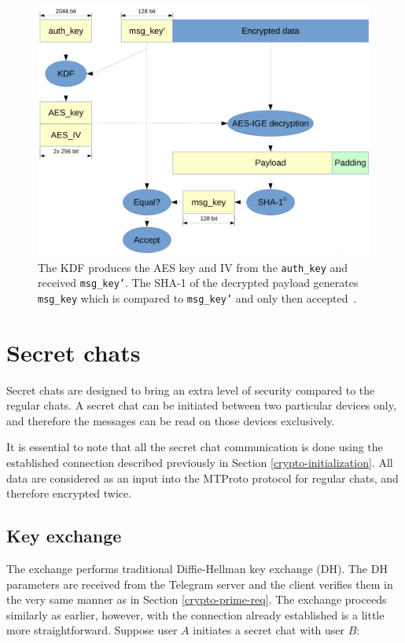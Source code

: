 \documentclass[thesis=M,english]{FITthesis}[2012/10/20]
\begin{document}
\begin{figure}[htb]
	\centering
	\includegraphics[width=1\textwidth]{mtproto-decflow.pdf}
	\caption[MTProto decryption flow]{The KDF produces the AES key and IV from the \texttt{auth\_key} and received \texttt{msg\_key'}. The SHA-1 of the decrypted payload generates \texttt{msg\_key} which is compared to \texttt{msg\_key'} and only then accepted~\cite{telegram-aarhus}.}
	\label{img:telegram-decflow}
\end{figure}




\section{Secret chats}\label{crypto-secret}

Secret chats are designed to bring an extra level of security compared to the regular chats. A secret chat can be initiated between two particular devices only, and therefore the messages can be read on those devices exclusively.

It is essential to note that all the secret chat communication is done using the established connection described previously in Section \ref{crypto-initialization}. All data are considered as an input into the MTProto protocol for regular chats, and therefore encrypted twice.

\subsection{Key exchange}\label{crypto-keyexchange}

The exchange performs traditional Diffie-Hellman key exchange (DH). The DH parameters are received from the Telegram server and the client verifies them in the very same manner as in Section \ref{crypto-prime-req}. The exchange proceeds similarly as earlier, however, with the connection already established is a little more straightforward. Suppose user $A$ initiates a secret chat with user $B$:
\end{document}
